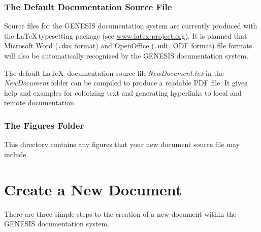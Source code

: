 \documentclass[12pt]{article}
\begin{document}
\subsubsection*{The Default Documentation Source File}

Source files for the GENESIS documentation system are currently produced with the \LaTeX\,typesetting package (see \href{http://www.latex-project.org/}{www.latex-project.org}). It is planned that Microsoft Word ({\tt .doc} format) and OpenOffice ({\tt .odt}, ODF format) file formats will also be automatically recognized by the GENESIS documentation system.

The default \LaTeX\, documentation source file\,{\it NewDocument.tex} in the {\it NewDocument} folder can be compiled to produce a readable PDF file. It gives help and examples for colorizing text and generating hyperlinks to local and remote documentation.

\subsubsection*{The Figures Folder}

This directory contains any figures that your new document source file may include.
 
\section*{Create a New Document}

There are three simple steps to the creation of a new document within the GENESIS documentation system.
\end{document}

